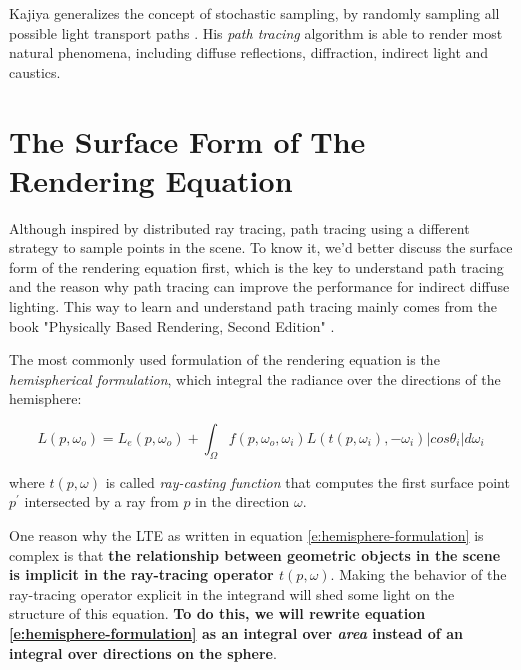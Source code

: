Kajiya generalizes the concept of stochastic sampling, by randomly sampling all possible light transport paths \cite[5mm]{a:TheRenderingEquation}. His \textit{path tracing} algorithm is able to render most natural phenomena, including diffuse reflections, diffraction, indirect light and caustics.




\section{The Surface Form of The Rendering Equation}\label{sec:surface-form}
Although inspired by distributed ray tracing, path tracing using a different strategy to sample points in the scene. To know it, we'd better discuss the surface form of the rendering equation first, which is the key to understand path tracing and the reason why path tracing can improve the performance for indirect diffuse lighting. This way to learn and understand path tracing mainly comes from the book "Physically Based Rendering, Second Edition" \cite{b:pbrt}.

The most commonly used formulation of the rendering equation is the \textit{hemispherical formulation}, which integral the radiance over the directions of the hemisphere:

\begin{equation}\label{e:hemisphere-formulation}
	L(p,\omega_o)=L_e(p,\omega_o)+\int_{\Omega}f(p,\omega_o,\omega_i)L(t(p,\omega_i),-\omega_i)|cos\theta_i|d\omega_i
\end{equation}

where $t(p,\omega)$ is called \textit{ray-casting function} that computes the first surface point $p^{'}$ intersected by a ray from $p$ in the direction $\omega$.

One reason why the LTE as written in equation \ref{e:hemisphere-formulation} is complex is that \textbf{the relationship between geometric objects in the scene is implicit in the ray-tracing operator $t(p,\omega)$}. Making the behavior of the ray-tracing operator explicit in the integrand will shed some light on the structure of this equation. \textbf{To do this, we will rewrite equation \ref{e:hemisphere-formulation} as an integral over \textit{area} instead of an integral over directions on the sphere}.

